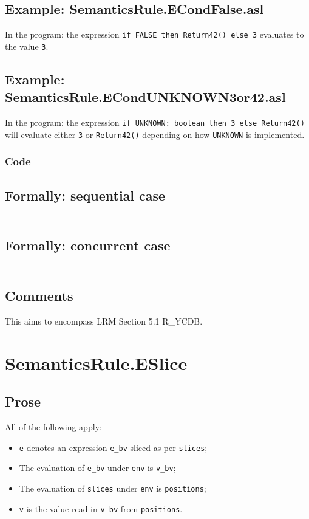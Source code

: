\documentclass{book}
\begin{document}
  \subsection{Example: SemanticsRule.ECondFalse.asl}
    In the program:
    the expression \texttt{if FALSE then Return42() else 3} evaluates to the value \texttt{3}.

  \subsection{Example: SemanticsRule.ECondUNKNOWN3or42.asl}
    In the program:
the expression \texttt{if UNKNOWN: boolean then 3 else Return42()} will
evaluate either \texttt{3} or \texttt{Return42()} depending on how
\texttt{UNKNOWN} is implemented.

  \subsubsection{Code}

  \subsection{Formally: sequential case}
  \begin{align}
  \end{align} 

  \subsection{Formally: concurrent case}
  \begin{align}
  \end{align} 

  \subsection{Comments}
  This aims to encompass LRM Section 5.1 R\_YCDB.

\section{SemanticsRule.ESlice \label{sec:SemanticsRule.ESlice}}

  \subsection{Prose}
  All of the following apply:
  \begin{itemize}
  \item \texttt{e} denotes an expression \texttt{e\_bv} sliced as per \texttt{slices};
  \item The evaluation of \texttt{e\_bv} under \texttt{env} is \texttt{v\_bv};
  \item The evaluation of \texttt{slices} under \texttt{env} is \texttt{positions};
  \item \texttt{v} is the value read in \texttt{v\_bv} from \texttt{positions}.
  \end{itemize}
\end{document}
